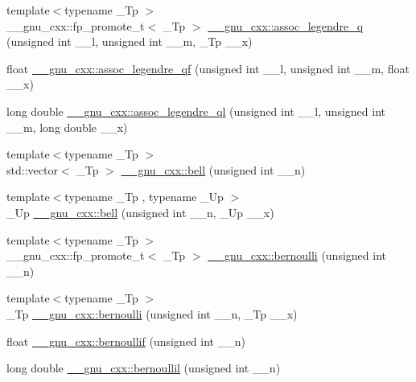 \begin{DoxyCompactItemize}
{\footnotesize template$<$typename \+\_\+\+Tp $>$ }\\\+\_\+\+\_\+gnu\+\_\+cxx\+::fp\+\_\+promote\+\_\+t$<$ \+\_\+\+Tp $>$ \hyperlink{group__gnu__math__spec__func_ga96a1223727fa71ffbf520a98ac3dc885}{\+\_\+\+\_\+gnu\+\_\+cxx\+::assoc\+\_\+legendre\+\_\+q} (unsigned int \+\_\+\+\_\+l, unsigned int \+\_\+\+\_\+m, \+\_\+\+Tp \+\_\+\+\_\+x)
\item 
float \hyperlink{group__gnu__math__spec__func_ga61d651dc8b3c42fe47a02b36e95f72c0}{\+\_\+\+\_\+gnu\+\_\+cxx\+::assoc\+\_\+legendre\+\_\+qf} (unsigned int \+\_\+\+\_\+l, unsigned int \+\_\+\+\_\+m, float \+\_\+\+\_\+x)
\item 
long double \hyperlink{group__gnu__math__spec__func_ga07a9e571759c6d24e96da8cc8268f91e}{\+\_\+\+\_\+gnu\+\_\+cxx\+::assoc\+\_\+legendre\+\_\+ql} (unsigned int \+\_\+\+\_\+l, unsigned int \+\_\+\+\_\+m, long double \+\_\+\+\_\+x)
\item 
{\footnotesize template$<$typename \+\_\+\+Tp $>$ }\\std\+::vector$<$ \+\_\+\+Tp $>$ \hyperlink{group__gnu__math__spec__func_gac07286d722248a7f3c65a13b49b1fef5}{\+\_\+\+\_\+gnu\+\_\+cxx\+::bell} (unsigned int \+\_\+\+\_\+n)
\item 
{\footnotesize template$<$typename \+\_\+\+Tp , typename \+\_\+\+Up $>$ }\\\+\_\+\+Up \hyperlink{group__gnu__math__spec__func_ga1e87244cb33a10de204856cafb19046f}{\+\_\+\+\_\+gnu\+\_\+cxx\+::bell} (unsigned int \+\_\+\+\_\+n, \+\_\+\+Up \+\_\+\+\_\+x)
\item 
{\footnotesize template$<$typename \+\_\+\+Tp $>$ }\\\+\_\+\+\_\+gnu\+\_\+cxx\+::fp\+\_\+promote\+\_\+t$<$ \+\_\+\+Tp $>$ \hyperlink{group__gnu__math__spec__func_gad339f0011df1967ec6c9e55bd1547bf4}{\+\_\+\+\_\+gnu\+\_\+cxx\+::bernoulli} (unsigned int \+\_\+\+\_\+n)
\item 
{\footnotesize template$<$typename \+\_\+\+Tp $>$ }\\\+\_\+\+Tp \hyperlink{group__gnu__math__spec__func_ga140e17e038ab0e3875c1b3fad09bc991}{\+\_\+\+\_\+gnu\+\_\+cxx\+::bernoulli} (unsigned int \+\_\+\+\_\+n, \+\_\+\+Tp \+\_\+\+\_\+x)
\item 
float \hyperlink{group__gnu__math__spec__func_gabcd77f012ae74989c4bb9ca61978481d}{\+\_\+\+\_\+gnu\+\_\+cxx\+::bernoullif} (unsigned int \+\_\+\+\_\+n)
\item 
long double \hyperlink{group__gnu__math__spec__func_gaac8f04abfdd6b744d11cb73ec1f564b1}{\+\_\+\+\_\+gnu\+\_\+cxx\+::bernoullil} (unsigned int \+\_\+\+\_\+n)

\end{DoxyCompactItemize}
